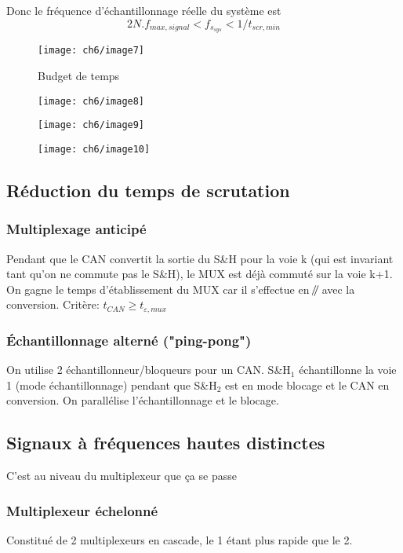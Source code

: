 Donc le fréquence d'échantillonnage réelle du système est
\[2N.f_{max,signal}<f_{s_{sys}}<1/t_{scr,min}\]
\begin{figure}[H] 
	\centering 
	\texttt{[image: ch6/image7]} 
	\caption{Budget de temps} 
\end{figure}
\begin{figure}[H] 
	\centering 
	\texttt{[image: ch6/image8]}  
\end{figure}
\begin{figure}[H] 
	\centering 
	\texttt{[image: ch6/image9]}  
\end{figure}
\begin{figure}[H] 
	\centering 
	\texttt{[image: ch6/image10]}  
\end{figure}
\subsection{Réduction du temps de scrutation}
\subsubsection{Multiplexage anticipé}
Pendant que le CAN convertit la sortie du S\&H pour la voie k (qui est invariant tant qu'on ne commute pas le S\&H), le MUX est déjà commuté sur la voie k+1. On gagne le temps d'établissement du MUX car il s'effectue en \(\mathbin{\!/\mkern-5mu/\!}\) avec la conversion. Critère: \(t_{CAN}\geq t_{\varepsilon,mux}\)
\subsubsection{Échantillonnage alterné ("ping-pong")}
On utilise 2 échantillonneur/bloqueurs pour un CAN. S\&H\(_1\) échantillonne la voie 1 (mode échantillonnage) pendant que S\&H\(_2\) est en mode blocage et le CAN en conversion. On parallélise l'échantillonnage et le blocage.
\subsection{Signaux à fréquences hautes distinctes}
C'est au niveau du multiplexeur que ça se passe
\subsubsection{Multiplexeur échelonné}
Constitué de 2 multiplexeurs en cascade, le 1 étant plus rapide que le 2.
